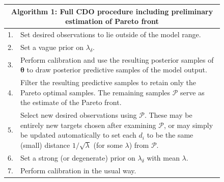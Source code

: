 \documentclass[12pt]{article}
\begin{document}
\begin{figure}
\centering
\begin{tabular}{|l|p{5.5in}|}
\hline
\multicolumn{2}{|c|}{Algorithm 1: Full CDO procedure including preliminary estimation of Pareto front}\\
\hline
1.&Set desired observations to lie outside of the model range.\\
2.&  Set a vague prior on $\lambda_\delta$.\\
3.&  Perform calibration and use the resulting posterior samples of $\boldsymbol\theta$ to draw posterior predictive samples of the model output.\\
4.&  Filter the resulting predictive samples to retain only the Pareto optimal samples. The remaining samples $\mathcal P$ serve as the estimate of the Pareto front.\\
5.& Select new desired observations using $\mathcal P$. These may be entirely new targets chosen after examining $\mathcal P$, or may simply be updated automatically to set each $d_i$ to be the same (small) distance $1/\sqrt{\lambda}$ (for some $\lambda$) from $\mathcal P$.\\
6.& Set a strong (or degenerate) prior on $\lambda_\delta$ with mean $\lambda$.\\
7.& Perform calibration in the usual way.\\
\hline
\end{tabular}
\label{alg:CDO_alg}
\end{figure}
\end{document}
